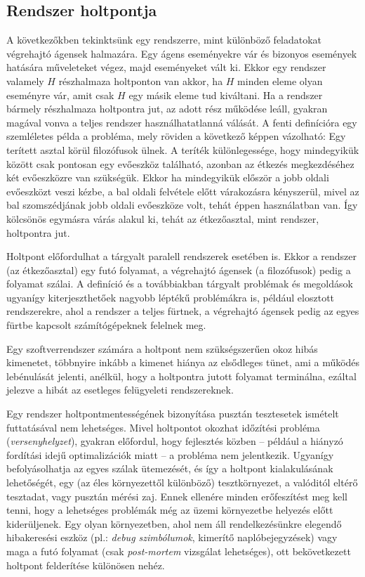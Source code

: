     \subsection{Rendszer holtpontja} 
      
    A következőkben tekinktsünk egy rendszerre, mint különböző feladatokat végrehajtó ágensek halmazára. Egy ágens eseményekre vár és bizonyos események hatására műveleteket végez, majd eseményeket vált ki. Ekkor egy rendszer valamely $H$ részhalmaza holtponton van akkor, ha $H$ minden eleme olyan eseményre vár, amit csak $H$ egy másik eleme tud kiváltani. Ha a rendszer bármely részhalmaza holtpontra jut, az adott rész működése leáll, gyakran magával vonva a teljes rendszer használhatatlanná válását. A fenti definícióra egy szemléletes példa a \cite{DiningPhilosophers} probléma, mely röviden a következő képpen vázolható: Egy terített asztal körül filozófusok ülnek. A teríték különlegessége, hogy mindegyikük között csak pontosan egy evőeszköz található, azonban az étkezés megkezdéséhez két evőeszközre van szükségük. Ekkor ha mindegyikük először a jobb oldali evőeszközt veszi kézbe, a bal oldali felvétele előtt várakozásra kényszerül, mivel az bal szomszédjának jobb oldali evőeszköze volt, tehát éppen használatban van. Így kölcsönös egymásra várás alakul ki, tehát az étkezőasztal, mint rendszer, holtpontra jut.
    
    Holtpont előfordulhat a tárgyalt paralell rendszerek esetében is. Ekkor a rendszer (az étkezőasztal) egy futó folyamat, a végrehajtó ágensek (a filozófusok) pedig a folyamat szálai. A definíció és a továbbiakban tárgyalt problémak és megoldások ugyanígy kiterjeszthetőek nagyobb léptékű problémákra is, például elosztott rendszerekre, ahol a rendszer a teljes fürtnek, a végrehajtó ágensek pedig az egyes fürtbe kapcsolt számítógépeknek felelnek meg.
    
    Egy szoftverrendszer számára a holtpont nem szükségszerűen okoz hibás kimenetet, többnyire inkább a kimenet hiánya az elsődleges tünet, ami a működés lebénulását jelenti, anélkül, hogy a holtpontra jutott folyamat terminálna, ezáltal jelezve a hibát az esetleges felügyeleti rendszereknek.
    
    Egy rendszer holtpontmentességének bizonyítása pusztán tesztesetek ismételt futtatásával nem lehetséges. Mivel holtpontot okozhat időzítési probléma (\emph{versenyhelyzet}), gyakran előfordul, hogy fejlesztés közben -- például a hiányzó fordítási idejű optimalizációk miatt -- a probléma nem jelentkezik. Ugyanígy befolyásolhatja az egyes szálak ütemezését, és így a holtpont kialakulásának lehetőségét, egy (az éles környezettől különböző) tesztkörnyezet, a valóditól eltérő tesztadat, vagy pusztán mérési zaj. Ennek ellenére minden erőfeszítést meg kell tenni, hogy a lehetséges problémák még az üzemi környezetbe helyezés előtt kiderüljenek. Egy olyan környezetben, ahol nem áll rendelkezésünkre elegendő hibakeresési eszköz (pl.: \emph{debug szimbólumok}, kimerítő naplóbejegyzések) vagy maga a futó folyamat (csak \emph{post-mortem} vizsgálat lehetséges), ott bekövetkezett holtpont felderítése különösen nehéz.
    
